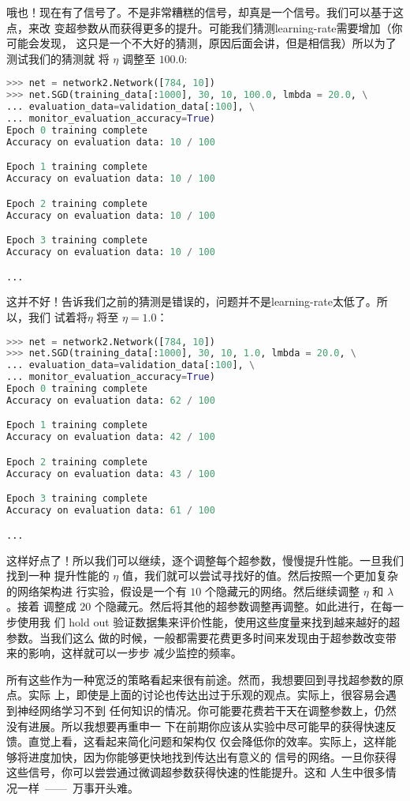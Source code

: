 哦也！现在有了信号了。不是非常糟糕的信号，却真是一个信号。我们可以基于这点，来改
变超参数从而获得更多的提升。可能我们猜测\gls*{learning-rate}需要增加（你可能会发现，
这只是一个不大好的猜测，原因后面会讲，但是相信我）所以为了测试我们的猜测就
将 $\eta$ 调整至 $100.0$:
\begin{lstlisting}[language=Python]
>>> net = network2.Network([784, 10])
>>> net.SGD(training_data[:1000], 30, 10, 100.0, lmbda = 20.0, \
... evaluation_data=validation_data[:100], \
... monitor_evaluation_accuracy=True)
Epoch 0 training complete
Accuracy on evaluation data: 10 / 100

Epoch 1 training complete
Accuracy on evaluation data: 10 / 100

Epoch 2 training complete
Accuracy on evaluation data: 10 / 100

Epoch 3 training complete
Accuracy on evaluation data: 10 / 100

...
\end{lstlisting}

这并不好！告诉我们之前的猜测是错误的，问题并不是\gls*{learning-rate}太低了。所以，我们
试着将$\eta$ 将至 $\eta=1.0$：
\begin{lstlisting}[language=Python]
>>> net = network2.Network([784, 10])
>>> net.SGD(training_data[:1000], 30, 10, 1.0, lmbda = 20.0, \
... evaluation_data=validation_data[:100], \
... monitor_evaluation_accuracy=True)
Epoch 0 training complete
Accuracy on evaluation data: 62 / 100

Epoch 1 training complete
Accuracy on evaluation data: 42 / 100

Epoch 2 training complete
Accuracy on evaluation data: 43 / 100

Epoch 3 training complete
Accuracy on evaluation data: 61 / 100

...
\end{lstlisting}

这样好点了！所以我们可以继续，逐个调整每个超参数，慢慢提升性能。一旦我们找到一种
提升性能的 $\eta$ 值，我们就可以尝试寻找好的值。然后按照一个更加复杂的网络架构进
行实验，假设是一个有 $10$ 个隐藏元的网络。然后继续调整 $\eta$ 和 $\lambda$。接着
调整成 $20$ 个隐藏元。然后将其他的超参数调整再调整。如此进行，在每一步使用我
们 hold out 验证数据集来评价性能，使用这些度量来找到越来越好的超参数。当我们这么
做的时候，一般都需要花费更多时间来发现由于超参数改变带来的影响，这样就可以一步步
减少监控的频率。

所有这些作为一种宽泛的策略看起来很有前途。然而，我想要回到寻找超参数的原点。实际
上，即使是上面的讨论也传达出过于乐观的观点。实际上，很容易会遇到神经网络学习不到
任何知识的情况。你可能要花费若干天在调整参数上，仍然没有进展。所以我想要再重申一
下在前期你应该从实验中尽可能早的获得快速反馈。直觉上看，这看起来简化问题和架构仅
仅会降低你的效率。实际上，这样能够将进度加快，因为你能够更快地找到传达出有意义的
信号的网络。一旦你获得这些信号，你可以尝尝通过微调超参数获得快速的性能提升。这和
人生中很多情况一样~——~万事开头难。

